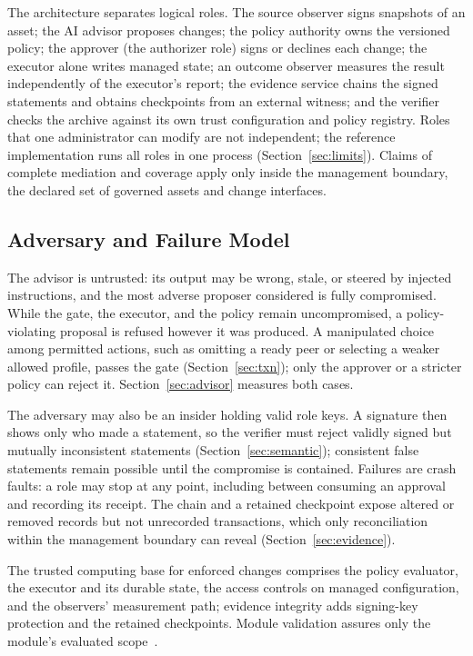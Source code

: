 \documentclass[journal]{IEEEtran}
\begin{document}
The architecture separates logical roles. The source observer signs snapshots of an asset; the AI advisor proposes changes; the policy authority owns the versioned policy; the approver (the authorizer role) signs or declines each change; the executor alone writes managed state; an outcome observer measures the result independently of the executor's report; the evidence service chains the signed statements and obtains checkpoints from an external witness; and the verifier checks the archive against its own trust configuration and policy registry. Roles that one administrator can modify are not independent; the reference implementation runs all roles in one process (Section~\ref{sec:limits}). Claims of complete mediation and coverage apply only inside the management boundary, the declared set of governed assets and change interfaces.

\subsection{Adversary and Failure Model}
The advisor is untrusted: its output may be wrong, stale, or steered by injected instructions, and the most adverse proposer considered is fully compromised. While the gate, the executor, and the policy remain uncompromised, a policy-violating proposal is refused however it was produced. A manipulated choice among permitted actions, such as omitting a ready peer or selecting a weaker allowed profile, passes the gate (Section~\ref{sec:txn}); only the approver or a stricter policy can reject it. Section~\ref{sec:advisor} measures both cases.

The adversary may also be an insider holding valid role keys. A signature then shows only who made a statement, so the verifier must reject validly signed but mutually inconsistent statements (Section~\ref{sec:semantic}); consistent false statements remain possible until the compromise is contained. Failures are crash faults: a role may stop at any point, including between consuming an approval and recording its receipt. The chain and a retained checkpoint expose altered or removed records but not unrecorded transactions, which only reconciliation within the management boundary can reveal (Section~\ref{sec:evidence}).

The trusted computing base for enforced changes comprises the policy evaluator, the executor and its durable state, the access controls on managed configuration, and the observers' measurement path; evidence integrity adds signing-key protection and the retained checkpoints. Module validation assures only the module's evaluated scope~\cite{fips140}.
\end{document}
